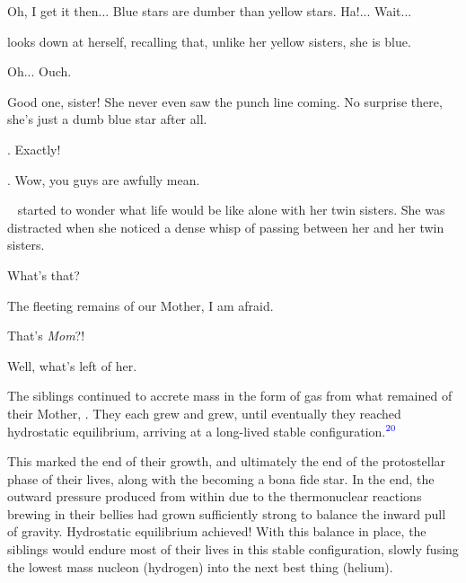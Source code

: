 \documentclass[main.tex]{subfiles}
\begin{document}
\par \Celaeno Oh, I get it then...  Blue stars are dumber than yellow stars.  Ha!...  Wait...

\par \nar \rmcelaeno looks down at herself, recalling that, unlike her yellow sisters, she is blue.

\par \Celaeno Oh...  Ouch.

\par \Alcyone Good one, sister!  She never even saw the punch line coming.  No surprise there, she's just a dumb blue star after all.

\par \Taygete. Exactly!

\par \Celaeno. Wow, you guys are awfully mean.

\par \nar \rmcelaeno~ started to wonder what life would be like alone with her twin sisters.  She was distracted when she noticed a dense whisp of \rmpleione passing between her and her twin sisters.  

\par \Celaeno What's that?

\par \Maia The fleeting remains of our Mother, I am afraid.

\par \Electra That's \textit{Mom}?!

\par \Maia Well, what's left of her.

\par \nar The siblings continued to accrete mass in the form of gas from what remained of their Mother, \rmpleione.  They each grew and grew, until eventually they reached hydrostatic equilibrium, arriving at a long-lived stable configuration.$^{\textcolor{blue}{20}}$  

\par \nar This marked the end of their growth, and ultimately the end of the protostellar phase of their lives, along with the becoming a bona fide star.  In the end, the outward pressure produced from within due to the thermonuclear reactions brewing in their bellies had grown sufficiently strong to balance the inward pull of gravity.  Hydrostatic equilibrium achieved!  With this balance in place, the siblings would endure most of their lives in this stable configuration, slowly fusing the lowest mass nucleon (hydrogen) into the next best thing (helium).
\end{document}
